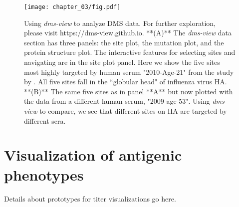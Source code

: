 \begin{figure}[ht]
  \centering
  \texttt{[image: chapter\_03/fig.pdf]}
  \caption{Using \emph{dms-view} to analyze DMS data. For further exploration, please visit https://dms-view.github.io. **(A)** The \emph{dms-view} data section has three panels: the site plot, the mutation plot, and the protein structure plot. The interactive features for selecting sites and navigating are in the site plot panel. Here we show the five sites most highly targeted by human serum "2010-Age-21" from the study by \citet{Lee2019}. All five sites fall in the ``globular head" of influenza virus HA. **(B)** The same five sites as in panel **A** but now plotted with the data from a different human serum, "2009-age-53". Using \emph{dms-view} to compare, we see that different sites on HA are targeted by different sera. \label{fig:fig}}
\end{figure}

\section{Visualization of antigenic phenotypes}

Details about prototypes for titer visualizations go here.
